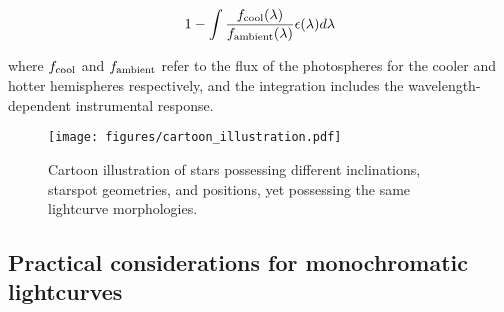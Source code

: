 \documentclass[twocolumn]{emulateapj}%
\begin{document}
\begin{equation}
1- \int \frac{f_{\rm cool}(\lambda)}{f_{\rm ambient}(\lambda)} \epsilon(\lambda) d\lambda
\end{equation}

where $f_{\rm cool}$ and $f_{\rm ambient}$ refer to the flux of the photospheres for the cooler and hotter hemispheres respectively, and the integration includes the wavelength-dependent instrumental response.




\begin{figure*}
 \centering
 \texttt{[image: figures/cartoon\_illustration.pdf]}
 \caption{Cartoon illustration of stars possessing different inclinations, starspot geometries, and positions, yet possessing the same lightcurve morphologies.}
 \label{fig:cartoon}
\end{figure*}

\subsection{Practical considerations for monochromatic lightcurves}
\end{document}
